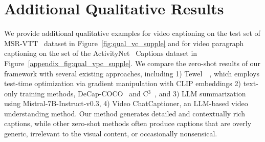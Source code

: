 
\section{Additional Qualitative Results}
\label{appendix_sec:qual}
We provide additional qualitative examples for video captioning on the test set of MSR-VTT~\cite{xu2016msr-vtt} dataset in Figure~\ref{fig:qual_vc_supple} and for video paragraph captioning on the  set of the ActivityNet~\cite{krishna2017dense} Captions dataset in Figure~\ref{appendix_fig:qual_vpc_supple}. 
We compare the zero-shot results of our framework with several existing approaches, including 1) Tewel~\etal~\cite{Tewel_2023_BMVC}, which employs test-time optimization via gradient manipulation with CLIP embeddings 2) text-only training methods, \ie DeCap-COCO~\cite{lidecap} and C$^{3}$~\cite{zhang2024connect}, and 3) LLM summarization using Mistral-7B-Instruct-v0.3, 4) Video ChatCaptioner, an LLM-based video understanding method. 
Our method generates detailed and contextually rich captions, while other zero-shot methods often produce captions that are overly generic, irrelevant to the visual content, or occasionally nonsensical.




 
